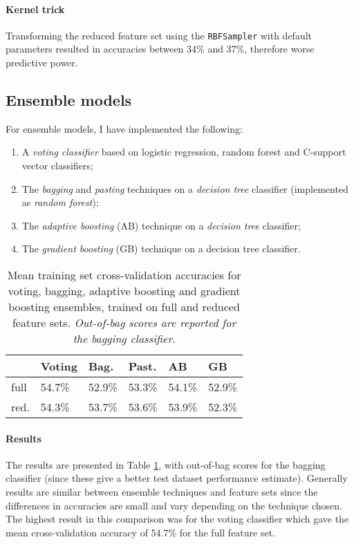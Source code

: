 \documentclass[10pt, twocolumn]{article}
\begin{document}
\paragraph{Kernel trick} Transforming the reduced feature set using the \texttt{RBFSampler} with default parameters resulted in accuracies between 34\% and 37\%, therefore worse predictive power.

\subsection{Ensemble models}
For ensemble models, I have implemented the following: 
\begin{enumerate}[label=(\textit{\roman*})]
	\item A \textit{voting classifier} based on logistic regression, random forest and C-support vector classifiers;
	\item The \textit{bagging} and \textit{pasting} techniques on a \textit{decision tree} classifier (implemented as \textit{random forest});
	\item The \textit{adaptive boosting} (AB) technique on a \textit{decision tree} classifier;
	\item The \textit{gradient boosting} (GB) technique on a decision tree classifier.
\end{enumerate}

\begin{table}[]
	\begin{tabularx}{\linewidth}{XXXXXX}
		\hline
			& \textbf{Voting} & \textbf{Bag.} &\textbf{Past.} & \textbf{AB} & \textbf{GB} \\ \hline
	full   & 54.7\%  & 52.9\% & 53.3\% & 54.1\% & 52.9\% \\
	red. & 54.3\% & 53.7\% & 53.6\% & 53.9\% & 52.3\% \\ 
	\hline
	\end{tabularx}
	\caption{Mean training set cross-validation accuracies for voting, bagging, adaptive boosting and gradient boosting ensembles, trained on full and reduced feature sets. \textit{Out-of-bag scores are reported for the bagging classifier}.}\label{ensemble}
\end{table}

\paragraph{Results} The results are presented in Table \ref{ensemble}, with out-of-bag scores for the bagging classifier (since these give a better test dataset performance estimate). Generally results are similar between ensemble techniques and feature sets since the differences in accuracies are small and vary depending on the technique chosen. The highest result in this comparison was for the voting classifier which gave the mean cross-validation accuracy of 54.7\% for the full feature set.
\end{document}
